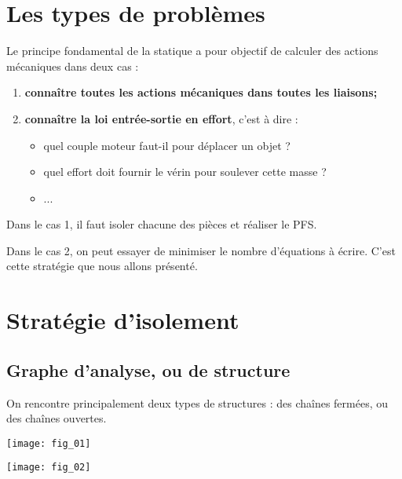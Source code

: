 \section{Les types de problèmes}

Le principe fondamental de la statique a pour objectif de calculer des actions mécaniques dans deux cas :
\begin{enumerate}
\item \textbf{connaître toutes les actions mécaniques dans toutes les liaisons;}
\item \textbf{connaître la loi entrée-sortie en effort}, c'est à dire :
\begin{itemize}
\item quel couple moteur faut-il pour déplacer un objet ?
\item quel effort doit fournir le vérin pour soulever cette masse ?
\item ...
\end{itemize}
\end{enumerate}

Dans le cas 1, il faut isoler chacune des pièces et réaliser le PFS. 

Dans le cas 2, on peut essayer de minimiser le nombre d'équations à écrire. C'est cette stratégie que nous allons présenté.


\section{Stratégie d'isolement}

\subsection{Graphe d'analyse, ou de structure}

On rencontre principalement deux types de structures : des chaînes fermées, ou des chaînes ouvertes.

\begin{minipage}[c]{.4\linewidth}
\begin{center}
\texttt{[image: fig\_01]}
\end{center}
\end{minipage}
\hfill
\begin{minipage}[c]{.55\linewidth}
\begin{center}
\texttt{[image: fig\_02]}
\end{center}
\end{minipage}

